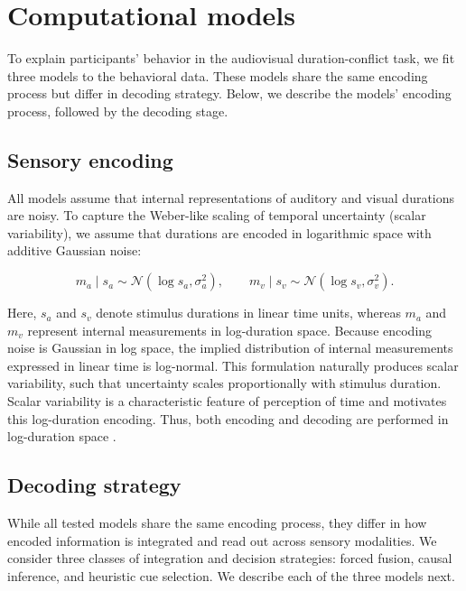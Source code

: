 \documentclass{biorxiv}
\providecommand{\citep}[1]{\cite{#1}}
\begin{document}
\section{Computational models}
To explain participants' behavior in the audiovisual duration-conflict task, we fit three models to the behavioral data. These models share the same encoding process but differ in decoding strategy. Below, we describe the models' encoding process, followed by the decoding stage.

\subsection{Sensory encoding}
All models assume that internal representations of auditory and visual durations are noisy. To capture the Weber-like scaling of temporal uncertainty (scalar variability), we assume that durations are encoded in logarithmic space with additive Gaussian noise: 

\begin{equation}
m_a \mid s_a \sim \mathcal{N}(\log s_a,\sigma_a^2), \qquad
m_v \mid s_v \sim \mathcal{N}(\log s_v,\sigma_v^2).
\end{equation}

\noindent Here, $s_a$ and $s_v$ denote stimulus durations in linear time units, whereas $m_a$ and $m_v$ represent internal measurements in log-duration space. Because encoding noise is Gaussian in log space, the implied distribution of internal measurements expressed in linear time is log-normal. This formulation naturally produces scalar variability, such that uncertainty scales proportionally with stimulus duration. Scalar variability is a characteristic feature of perception of time and motivates this log-duration encoding. Thus, both encoding and decoding are performed in log-duration space \citep{killeen1987optimal, wittmann2009inner,ren2020ensemble}.

\subsection{Decoding strategy}
While all tested models share the same encoding process, they differ in how encoded information is integrated and read out across sensory modalities. We consider three classes of integration and decision strategies: forced fusion, causal inference, and heuristic cue selection. We describe each of the three models next.  

% 
\end{document}
